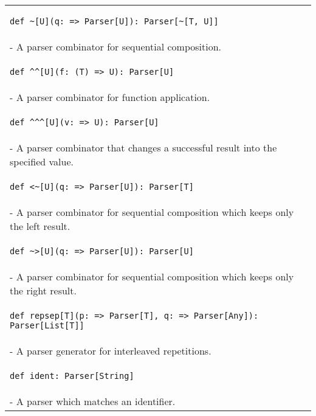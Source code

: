 \begin{table}[t]
\centering
\begin{tabular}{l}
\hline
\begin{lstlisting}
def ~[U](q: => Parser[U]): Parser[~[T, U]]
\end{lstlisting} \\
\hspace{.2in}- A parser combinator for sequential composition. \\
\hline
\begin{lstlisting}
def ^^[U](f: (T) => U): Parser[U]
\end{lstlisting} \\
\hspace{.2in}- A parser combinator for function application. \\
\hline
\begin{lstlisting}
def ^^^[U](v: => U): Parser[U]
\end{lstlisting} \\
\hspace{.2in}- A parser combinator that changes a successful result into the specified value. \\
\hline
\begin{lstlisting}
def <~[U](q: => Parser[U]): Parser[T]
\end{lstlisting} \\
\hspace{.2in}- A parser combinator for sequential composition which keeps only the left result. \\
\hline
\begin{lstlisting}
def ~>[U](q: => Parser[U]): Parser[U]
\end{lstlisting} \\
\hspace{.2in}- A parser combinator for sequential composition which keeps only the right result. \\
\hline
\begin{lstlisting}
def repsep[T](p: => Parser[T], q: => Parser[Any]): Parser[List[T]]
\end{lstlisting} \\
\hspace{.2in}- A parser generator for interleaved repetitions. \\
\hline
\begin{lstlisting}
def ident: Parser[String]
\end{lstlisting} \\
\hspace{.2in}- A parser which matches an identifier. \\

\end{tabular}
\end{table}
